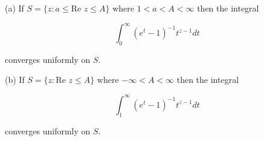 (a) If $S = \{z : a \leq \text{Re } z \leq A\}$ where $1 < a < A < \infty$ then the integral

$$\int_0^\infty (e^t - 1)^{-1} t^{z-1} dt$$

converges uniformly on $S$.

(b) If $S = \{z : \text{Re } z \leq A\}$ where $-\infty < A < \infty$ then the integral

$$\int_1^\infty (e^t - 1)^{-1} t^{z-1} dt$$

converges uniformly on $S$.